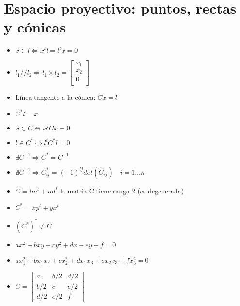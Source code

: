 \documentclass[12pt,a4paper]{article}
\begin{document}
\setlength{\parindent}{0pt} %

\section{Espacio proyectivo: puntos, rectas y c\'onicas}

\begin{itemize}
	\item $x \in l \Leftrightarrow x^{t}l = l^{t} x = 0$

	\item $l_{1} // l_{2} \Rightarrow l_{1} \times l_{2} = \left[ {\begin{smallmatrix}
	 x_{1}\\
	 x_{2}\\
	 0\\
	\end{smallmatrix} } \right]
	$

	\item Linea tangente a la c\'onica: $C x = l$

	\item $C^{*} l = x$

	\item $x \in C \Leftrightarrow x^{t} C x = 0$


	\item $l \in C^{*} \Leftrightarrow l^{t} C^{*} l = 0$

	\item $ \exists C^{-1} \Rightarrow C^{*} = C^{-1}$

	\item $ \nexists C^{-1} \Rightarrow C_{ij}^{*} = (-1)^{ij} det(\hat{C}_{ij}) \quad i=1\dots n$

	\item $C = lm^{t}+ml^{t}$ la matriz C tiene rango 2 (es degenerada)

	\item $C^{*} = xy^{t}+yx^{t}$

	\item $(C^{*})^{*}  \neq C$

	\item $ax^{2}+bxy+cy^{2}+dx+ey+f = 0$

	\item $ax_{1}^{2}+bx_{1}x_{2}+cx_{2}^{2}+dx_{1}x_{3}+ex_{2}x_{3}+fx_{3}^{2} = 0$


	\item $
	C =
	\left[ {\begin{smallmatrix}
	 a & b/2 & d/2 \\
	 b/2 & c & e/2 \\
	 d/2 & e/2 & f
	\end{smallmatrix} } \right]
	$
\end{itemize}
\end{document}

